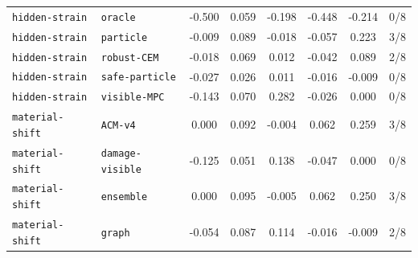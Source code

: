 \documentclass{article}
\begin{document}
\begin{center}
\begin{tabular}{llcccccc}
\texttt{hidden-strain} & \texttt{oracle} & -0.500 & 0.059 & -0.198 & -0.448 & -0.214 & 0/8 \\
\texttt{hidden-strain} & \texttt{particle} & -0.009 & 0.089 & -0.018 & -0.057 & 0.223 & 3/8 \\
\texttt{hidden-strain} & \texttt{robust-CEM} & -0.018 & 0.069 & 0.012 & -0.042 & 0.089 & 2/8 \\
\texttt{hidden-strain} & \texttt{safe-particle} & -0.027 & 0.026 & 0.011 & -0.016 & -0.009 & 0/8 \\
\texttt{hidden-strain} & \texttt{visible-MPC} & -0.143 & 0.070 & 0.282 & -0.026 & 0.000 & 0/8 \\
\texttt{material-shift} & \texttt{ACM-v4} & 0.000 & 0.092 & -0.004 & 0.062 & 0.259 & 3/8 \\
\texttt{material-shift} & \texttt{damage-visible} & -0.125 & 0.051 & 0.138 & -0.047 & 0.000 & 0/8 \\
\texttt{material-shift} & \texttt{ensemble} & 0.000 & 0.095 & -0.005 & 0.062 & 0.250 & 3/8 \\
\texttt{material-shift} & \texttt{graph} & -0.054 & 0.087 & 0.114 & -0.016 & -0.009 & 2/8 \\
\bottomrule
\end{tabular}
\end{center}
\end{document}
